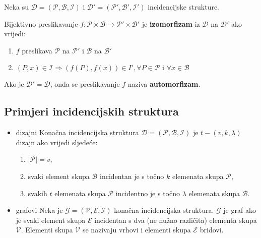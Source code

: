 \bigskip
\noindent
Neka su $\mathcal{D} = (\mathcal{P}, \mathcal{B}, \mathcal{I})$ i
$\mathcal{D}' = (\mathcal{P}', \mathcal{B}', \mathcal{I}')$ incidencijske
strukture.

\noindent
Bijektivno preslikavanje
$f: \mathcal{P} \times \mathcal{B} \to \mathcal{P}' \times \mathcal{B}'$ je
\textbf{izomorfizam} iz $\mathcal{D}$ na $\mathcal{D}'$ ako vrijedi:
\begin{enumerate}
    \item $f$ preslikava $\mathcal{P}$ na $\mathcal{P}'$ i $\mathcal{B}$ na $\mathcal{B}'$
    \item $(P, x) \in \mathcal{I} \Rightarrow (f (P), f (x)) \in I', \forall P \in \mathcal{P}\text{ i }\forall x \in \mathcal{B}$
\end{enumerate}

Ako je $\mathcal{D}' = \mathcal{D}$, onda se preslikavanje $f$ naziva
\textbf{automorfizam}.

\subsection{Primjeri incidencijskih struktura}

\begin{itemize}
    \item dizajni\newline
    Konačna incidencijska struktura
    $\mathcal{D} = (\mathcal{P}, \mathcal{B}, \mathcal{I})$ je
    $t - (v, k, \lambda)$ dizajn ako vrijedi sljedeće:
    \begin{enumerate}
        \item $|\mathcal{P}| = v$,
        \item svaki element skupa $\mathcal{B}$ incidentan je s točno $k$
        elemenata skupa $\mathcal{P}$,
        \item svakih $t$ elemenata skupa $\mathcal{P}$ incidentno je s točno
        $\lambda$ elemenata skupa $\mathcal{B}$.
    \end{enumerate}
    \item grafovi\newline
    Neka je $\mathcal{G} = (\mathcal{V}, \mathcal{E}, \mathcal{I})$ konačna
    incidencijska struktura. $\mathcal{G}$ je graf ako je svaki element skupa
    $\mathcal{E}$ incidentan s dva (ne nužno različita) elementa skupa
    $\mathcal{V}$. Elementi skupa $\mathcal{V}$ se nazivaju vrhovi i elementi
    skupa $\mathcal{E}$ bridovi.
\end{itemize}
